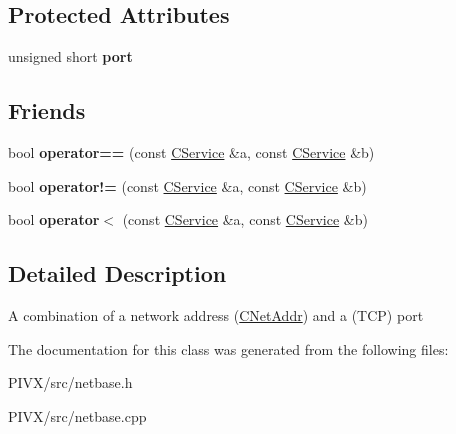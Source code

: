 \subsection*{Protected Attributes}
\begin{DoxyCompactItemize}
\item 
\mbox{\label{class_c_service_aef17734203dc2125cbdf4d23e50be410}} 
unsigned short {\bfseries port}
\end{DoxyCompactItemize}
\subsection*{Friends}
\begin{DoxyCompactItemize}
\item 
\mbox{\label{class_c_service_a7abc2516fa7e015cafcf9b98bc33e2ea}} 
bool {\bfseries operator==} (const \mbox{\hyperlink{class_c_service}{C\+Service}} \&a, const \mbox{\hyperlink{class_c_service}{C\+Service}} \&b)
\item 
\mbox{\label{class_c_service_a5834e0ab5104fffac621ea53fa2c3860}} 
bool {\bfseries operator!=} (const \mbox{\hyperlink{class_c_service}{C\+Service}} \&a, const \mbox{\hyperlink{class_c_service}{C\+Service}} \&b)
\item 
\mbox{\label{class_c_service_a26d0e22a8e7ae213b25467da3556c9e4}} 
bool {\bfseries operator$<$} (const \mbox{\hyperlink{class_c_service}{C\+Service}} \&a, const \mbox{\hyperlink{class_c_service}{C\+Service}} \&b)
\end{DoxyCompactItemize}


\subsection{Detailed Description}
A combination of a network address (\mbox{\hyperlink{class_c_net_addr}{C\+Net\+Addr}}) and a (T\+CP) port 

The documentation for this class was generated from the following files\+:\begin{DoxyCompactItemize}
\item 
P\+I\+V\+X/src/netbase.\+h\item 
P\+I\+V\+X/src/netbase.\+cpp\end{DoxyCompactItemize}
